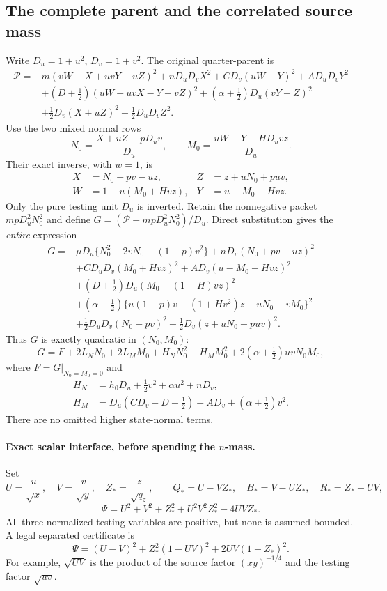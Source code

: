\subsection{The complete parent and the correlated source mass}

Write $D_u=1+u^2$, $D_v=1+v^2$.  The original quarter-parent is
\begin{align}
 \mathcal P={}&m(vW-X+uvY-uZ)^2+nD_uD_vX^2
  +CD_v(uW-Y)^2+AD_uD_vY^2\\
 &+(D+\tfrac12)(uW+uvX-Y-vZ)^2
  +(\alpha+\tfrac12)D_u(vY-Z)^2\\
 &+\tfrac12D_v(X+uZ)^2-\tfrac12D_uD_vZ^2.               \tag{RFN4}
\end{align}
Use the two mixed normal rows
\[
 N_0=\frac{X+uZ-pD_uv}{D_u},\qquad
 M_0=\frac{uW-Y-HD_uvz}{D_u}.                            \tag{RFN5}
\]
Their exact inverse, with $w=1$, is
\[
 \begin{aligned}
 X&=N_0+pv-uz,&Z&=z+uN_0+puv,\\
 W&=1+u(M_0+Hvz),&Y&=u-M_0-Hvz.
 \end{aligned}                                           \tag{RFN6}
\]
Only the pure testing unit $D_u$ is inverted.  Retain the nonnegative
packet $mpD_u^2N_0^2$ and define
$G=(\mathcal P-mpD_u^2N_0^2)/D_u$.  Direct substitution gives the
\emph{entire} expression
\begin{align}
 G={}&\mu D_u\{N_0^2-2vN_0+(1-p)v^2\}
       +nD_v(N_0+pv-uz)^2\\
 &+CD_uD_v(M_0+Hvz)^2+A D_v(u-M_0-Hvz)^2\\
 &+(D+\tfrac12)D_u(M_0-(1-H)vz)^2\\
 &+(\alpha+\tfrac12)
   \{u(1-p)v-(1+Hv^2)z-uN_0-vM_0\}^2\\
 &+\tfrac12D_uD_v(N_0+pv)^2
       -\tfrac12D_v(z+uN_0+puv)^2.                      \tag{RFN7}
\end{align}
Thus $G$ is exactly quadratic in $(N_0,M_0)$:
\[
 G=F+2L_NN_0+2L_MM_0+H_NN_0^2+H_MM_0^2
                  +2(\alpha+\tfrac12)uvN_0M_0,          \tag{RFN8}
\]
where $F=G|_{N_0=M_0=0}$ and
\[
 \begin{split}
 H_N&=h_0D_u+\tfrac12v^2+\alpha u^2+nD_v,\\
 H_M&=D_u(CD_v+D+\tfrac12)+AD_v+(\alpha+\tfrac12)v^2.
 \end{split}                                           \tag{RFN9}
\]
There are no omitted higher state-normal terms.

\paragraph{Exact scalar interface, before spending the $n$-mass.}
Set
\[
 U=\frac u{\sqrt x},\quad V=\frac v{\sqrt y},\quad
 Z_* =\frac z{\sqrt{q_z}},\qquad
 Q_*=U-VZ_*,\quad B_*=V-UZ_*,\quad R_*=Z_*-UV,
\]
\[
 \Psi=U^2+V^2+Z_*^2+U^2V^2Z_*^2-4UVZ_*.                 \tag{RFN10}
\]
All three normalized testing variables are positive, but none is
assumed bounded.  A legal separated certificate is
\[
 \Psi=(U-V)^2+Z_*^2(1-UV)^2+2UV(1-Z_*)^2.               \tag{RFN11}
\]
For example, $\sqrt{UV}$ is the product of the source factor
$(xy)^{-1/4}$ and the testing factor $\sqrt{uv}$.

